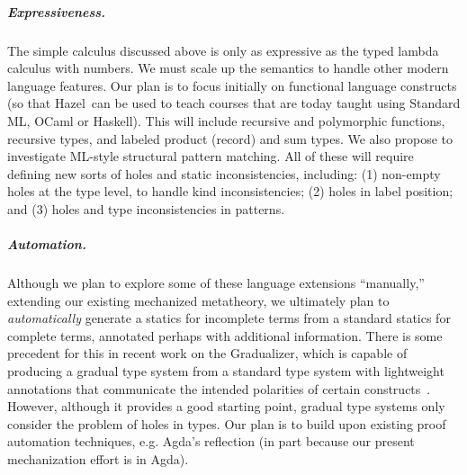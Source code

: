 \documentclass[letterpaper,USenglish]{lipics-v2016}
\newcommand{\Hazel}[0]{\textsf{Hazel}}
\newcommand{\HazelEnv}[0]{\Hazel}
\begin{document}
\vspace{-10px}
\subparagraph{Expressiveness.} The simple calculus discussed above 
    is only as expressive as the typed lambda calculus with numbers. We must scale up the semantics to handle other modern language
    features. Our plan is to focus initially on functional language
    constructs (so that \HazelEnv ~can be used to teach courses that
    are today taught using Standard ML, OCaml or Haskell). This will include recursive and
    polymorphic functions, recursive types, and labeled product (record) and sum types.
    We also propose to investigate ML-style structural pattern
    matching. All of these will require defining new sorts of holes and static
    inconsistencies, including: (1) non-empty holes at the type level, to handle
    kind inconsistencies; (2) holes in label position; and (3) holes and type inconsistencies in patterns. 

\vspace{-10px}
\subparagraph{Automation.} Although we plan to
    explore some of these language extensions 
    ``manually,'' extending our existing mechanized metatheory, we ultimately plan 
    to \emph{automatically}
    generate a statics for incomplete terms from a standard statics for complete terms,
    annotated perhaps with additional information. There is some precedent for
    this in recent work on the Gradualizer, which is capable of
    producing a gradual type system from a standard type system with lightweight
    annotations that communicate the intended polarities of certain
    constructs~\cite{DBLP:conf/popl/CiminiS16}. However, although it provides a good starting point, gradual type systems 
    only consider the problem of holes in 
    types.
    Our plan is to build 
    upon existing proof automation techniques, e.g. Agda's reflection \cite{van2012engineering} (in part because our present mechanization effort is in Agda).
\end{document}
